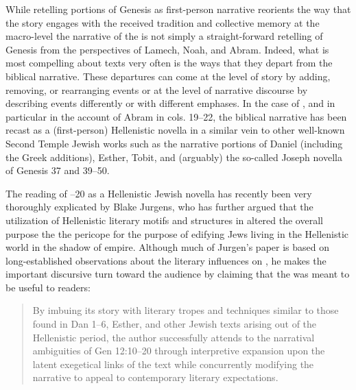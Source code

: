 While retelling portions of Genesis as first-person narrative reorients
the way that the story engages with the received tradition and
collective memory at the macro-level the narrative of the
\ga is not simply a straight-forward retelling of
Genesis from the perspectives of Lamech, Noah, and Abram. Indeed, what
is most compelling about \rwb texts very often is the
ways that they depart from the biblical narrative. These departures can
come at the level of story by adding, removing, or rearranging events or
at the level of narrative discourse by describing events differently or
with different emphases. In the case of \ga, and in
particular in the account of Abram in cols. 19--22, the biblical
narrative has been recast as a (first-person) Hellenistic novella in a
similar vein to other well-known Second Temple Jewish works such as the
narrative portions of Daniel (including the Greek additions), Esther,
Tobit, and (arguably) the so-called Joseph novella of Genesis 37 and
39--50.\autocites*[See especially Lawrence Wills work on the Jewish
novels and novellas in antiquity:][]{wills2002}[as well as his important
earlier works:][]{wills1995}[and][]{wills1990}

The reading of --20 as a Hellenistic Jewish
novella has recently been very thoroughly explicated by Blake Jurgens,
who has further argued that the utilization of Hellenistic literary
motifs and structures in \ga altered the overall purpose
the the pericope for the purpose of edifying Jews living in the
Hellenistic world in the shadow of empire.\autocite{jurgens_jsj2018}
Although much of Jurgen's paper is based on long-established
observations about the literary influences on \ga, he
makes the important discursive turn toward the audience by claiming that
the \ga was meant to be useful to readers:

\begin{quote}
By imbuing its story with literary tropes and techniques similar to
those found in Dan 1--6, Esther, and other Jewish texts arising out of
the Hellenistic period, the author successfully attends to the
narratival ambiguities of Gen 12:10--20 through interpretive expansion
upon the latent exegetical links of the text while concurrently
modifying the narrative to appeal to contemporary literary
expectations.\autocite[27]{jurgens_jsj2018}
\end{quote}

